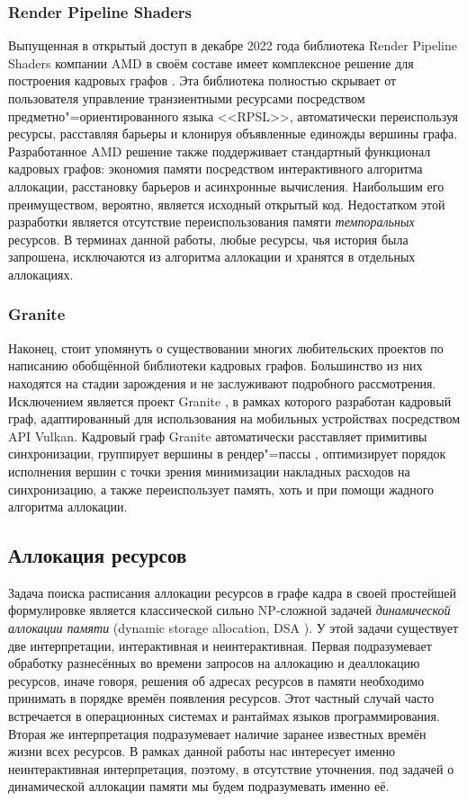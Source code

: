 \subsubsection*{Render Pipeline Shaders}
Выпущенная в открытый доступ \cite{RPSgithub} в декабре 2022 года библиотека Render Pipeline Shaders компании AMD в своём составе имеет комплексное решение для построения кадровых графов \cite{RPSpost}.
Эта библиотека полностью скрывает от пользователя управление транзиентными ресурсами посредством предметно"=ориентированного языка <<RPSL>>, автоматически переиспользуя ресурсы, расставляя барьеры и клонируя объявленные единожды вершины графа. Разработанное AMD решение также поддерживает стандартный функционал кадровых графов: экономия памяти посредством интерактивного алгоритма аллокации, расстановку барьеров и асинхронные вычисления. Наибольшим его преимуществом, вероятно, является исходный открытый код. Недостатком этой разработки является отсутствие переиспользования памяти \textit{темпоральных} ресурсов. В терминах данной работы, любые ресурсы, чья история была запрошена, исключаются из алгоритма аллокации и хранятся в отдельных аллокациях.

\subsubsection*{Granite}
Наконец, стоит упомянуть о существовании многих любительских проектов по написанию обобщённой библиотеки кадровых графов. Большинство из них находятся на стадии зарождения и не заслуживают подробного рассмотрения.
Исключением является проект Granite \cite{GraniteBlogPost}, в рамках которого разработан кадровый граф, адаптированный для использования на мобильных устройствах посредством API Vulkan.
Кадровый граф Granite автоматически расставляет примитивы синхронизации, группирует вершины в рендер"=пассы \cite[раздел~8]{VulkanSpec}, оптимизирует порядок исполнения вершин с точки зрения минимизации накладных расходов на синхронизацию, а также переиспользует память, хоть и при помощи жадного алгоритма аллокации.

\subsection{Аллокация ресурсов}
Задача поиска расписания аллокации ресурсов в графе кадра в своей простейшей формулировке является классической сильно NP-сложной \cite{DSAnpcomplete} задачей \textit{динамической аллокации памяти} (dynamic storage allocation, DSA \cite[с. 226]{10.5555/574848}).
У этой задачи существует две интерпретации, интерактивная и неинтерактивная.
Первая подразумевает обработку разнесённых во времени запросов на аллокацию и деаллокацию ресурсов, иначе говоря, решения об адресах ресурсов в памяти необходимо принимать в порядке времён появления ресурсов.
Этот частный случай часто встречается в операционных системах и рантаймах языков программирования.
Вторая же интерпретация подразумевает наличие заранее известных времён жизни всех ресурсов.
В рамках данной работы нас интересует именно неинтерактивная интерпретация, поэтому, в отсутствие уточнения, под задачей о динамической аллокации памяти мы будем подразумевать именно её.

